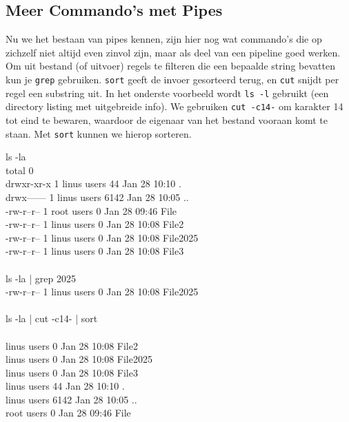 \subsection{Meer Commando's met Pipes}\label{meer-commandos-met-pipes}

Nu we het bestaan van pipes kennen, zijn hier nog wat commando's die op zichzelf niet altijd even zinvol zijn, maar als deel van een pipeline goed werken. Om uit bestand (of uitvoer) regels te filteren die een bepaalde string bevatten kun je \texttt{grep} gebruiken. \texttt{sort} geeft de invoer gesorteerd terug, en \texttt{cut} snijdt per regel een substring uit. In het onderste voorbeeld wordt \texttt{ls\ -l} gebruikt (een directory listing met uitgebreide info). We gebruiken \texttt{cut\ -c14-} om karakter 14 tot eind te bewaren, waardoor de eigenaar van het bestand vooraan komt te staan. Met \texttt{sort} kunnen we hierop sorteren.

\begin{bash}
\userprompt[~/Folder] ls -la\\
total 0\\
drwxr-xr-x 1 linus users   44 Jan 28 10:10 .\\
drwx------ 1 linus users 6142 Jan 28 10:05 ..\\
-rw-r--r-- 1 root  users    0 Jan 28 09:46 File\\
-rw-r--r-- 1 linus users    0 Jan 28 10:08 File2\\
-rw-r--r-- 1 linus users    0 Jan 28 10:08 File2025\\
-rw-r--r-- 1 linus users    0 Jan 28 10:08 File3\\
\\
\userprompt[~/Folder] ls -la | grep 2025\\
-rw-r--r-- 1 linus users 0 Jan 28 10:08 File2025\\
\\
\userprompt[~/Folder] ls -la | cut -c14- | sort\\
\\
linus users    0 Jan 28 10:08 File2\\
linus users    0 Jan 28 10:08 File2025\\
linus users    0 Jan 28 10:08 File3\\
linus users   44 Jan 28 10:10 .\\
linus users 6142 Jan 28 10:05 ..\\
root  users    0 Jan 28 09:46 File\\
\end{bash}

